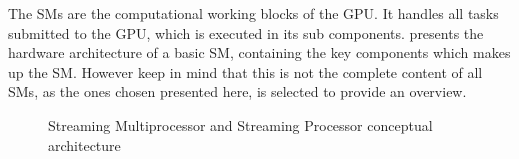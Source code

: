 The SMs are the computational working blocks of the GPU.
It handles all tasks submitted to the GPU, which is executed in its sub components.
 presents the hardware architecture of a basic SM, containing the key components which makes up the SM.
However keep in mind that this is not the complete content of all SMs, as the ones chosen presented here, is selected to provide an overview.

\begin{figure}[H]
	\centering
	\caption{Streaming Multiprocessor and Streaming Processor conceptual architecture}
	\label{fig:hw-sm}
\end{figure}

